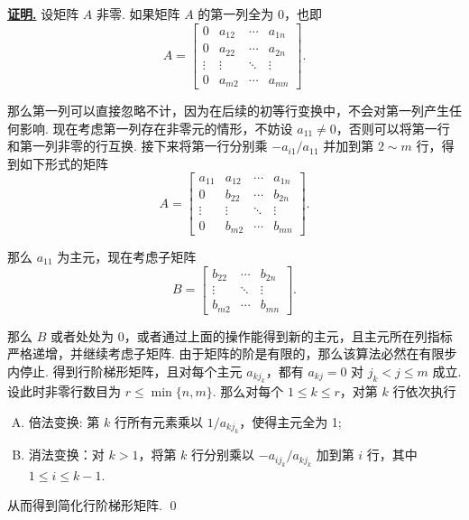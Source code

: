 \documentclass[10pt,openany]{article}
\theoremstyle{thmstyle} %
\theoremstyle{defstyle} %
\theoremstyle{prostyle} %
\theoremstyle{exastyle}
\theoremstyle{remstyle}
\renewenvironment{proof}[1][证明]{\par\underline{\textbf{#1.}} \;\fangsong}{\qed\par}
\begin{document}
\begin{proof}
	设矩阵 \( A \) 非零. 如果矩阵 \( A \) 的第一列全为 0，也即
	\[ A=\begin{bmatrix}
		0 & a_{12} & \cdots & a_{1n} \\
		0 & a_{22} & \cdots & a_{2n} \\
		\vdots & \vdots & \ddots & \vdots \\
		0 & a_{m2} & \cdots & a_{mn}
	\end{bmatrix}. \]
	
	那么第一列可以直接忽略不计，因为在后续的初等行变换中，不会对第一列产生任何影响. 现在考虑第一列存在非零元的情形，不妨设 \( a_{11} \neq 0 \)，否则可以将第一行和第一列非零的行互换. 接下来将第一行分别乘 \( -a_{i1}/a_{11} \) 并加到第 \( 2 \sim m \) 行，得到如下形式的矩阵
	\[ A=\begin{bmatrix}
		a_{11} & a_{12} & \cdots & a_{1n} \\
		0 & b_{22} & \cdots & b_{2n} \\
		\vdots & \vdots & \ddots & \vdots \\
		0 & b_{m2} & \cdots & b_{mn}
	\end{bmatrix}. \] 
	
	那么 \( a_{11} \) 为主元，现在考虑子矩阵
	\[ B=\begin{bmatrix}
		 b_{22} & \cdots & b_{2n} \\
		 \vdots & \ddots & \vdots \\
		 b_{m2} & \cdots & b_{mn}
	\end{bmatrix}. \]
	
	那么 \( B \) 或者处处为 0，或者通过上面的操作能得到新的主元，且主元所在列指标严格递增，并继续考虑子矩阵. 由于矩阵的阶是有限的，那么该算法必然在有限步内停止. 得到行阶梯形矩阵，且对每个主元 \( a_{kj_k} \)，都有 \( a_{kj}=0 \) 对 \( j_k<j \leq m  \) 成立. 设此时非零行数目为 \(  r \leq \min\{ n,m \} \). 那么对每个 \( 1 \leq k \leq r \)，对第 \( k \) 行依次执行
	\begin{enumerate}[(A)]
		\item 倍法变换: 第 \( k \) 行所有元素乘以 \( 1/a_{kj_k} \)，使得主元全为 1;
		\item 消法变换：对 \( k>1 \)，将第 \( k \) 行分别乘以 \( -a_{ij_k}/a_{kj_k} \) 加到第 \( i \) 行，其中 \( 1 \leq i \leq k-1 \).
	\end{enumerate}
	
	从而得到简化行阶梯形矩阵.
\end{proof}

\vspace{2ex}
\end{document}
